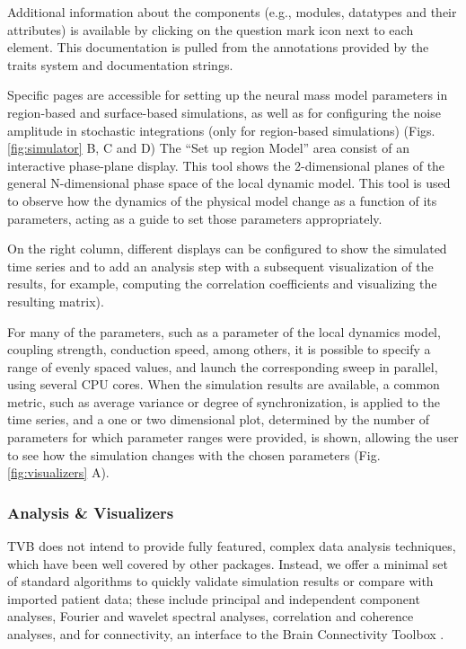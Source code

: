 		Additional information about the components (e.g., modules, datatypes
		and their attributes) is available  by clicking on the question
		mark icon next to each element. This documentation is pulled from the
		annotations provided by the traits system and documentation strings.

		Specific pages are accessible for setting up the neural mass model
		parameters in region-based and surface-based simulations, as well as
		for configuring the noise amplitude in stochastic integrations (only
		for region-based simulations) (Figs. \ref{fig:simulator} B, C and D)
		The ``Set up region Model'' area consist of an interactive phase-plane
		display. This tool shows the 2-dimensional planes of the general
		N-dimensional phase space of the local dynamic model. This tool is
		used to observe how the dynamics of the physical model change as a
		function of its parameters, acting as a guide to set those parameters
		appropriately.

		On the right column, different displays can be configured to show 
		the simulated time series and to add an analysis step with a subsequent
        visualization of the
		results, for example, computing the correlation coefficients and visualizing the
		resulting matrix).

        For many of the parameters, such as 
        a parameter of the local dynamics model, coupling
		strength, conduction speed, among others, 
        it is possible to specify a range of evenly
        spaced values, and launch the corresponding sweep in
        parallel, using several CPU cores. When the simulation results
        are available, a common metric, such as average variance or 
        degree of synchronization, is applied to the time series, and a 
        one or two dimensional plot, determined by the number of parameters
        for which parameter ranges were provided, is shown, allowing
        the user to see how the simulation changes with the chosen parameters
		(Fig.\ref{fig:visualizers} A).
		
		\subsubsection{Analysis \& Visualizers}

			TVB does not intend to provide fully featured, complex data analysis
            techniques, which have been well covered by other packages. 
            Instead, we offer a minimal set of standard algorithms to quickly
            validate simulation results or compare with imported patient data; 
            these include principal and independent component analyses, 
            Fourier and wavelet spectral analyses, correlation and coherence
            analyses, and for connectivity, an interface to the Brain 
            Connectivity Toolbox \citep{Rubinov_2010}. 

